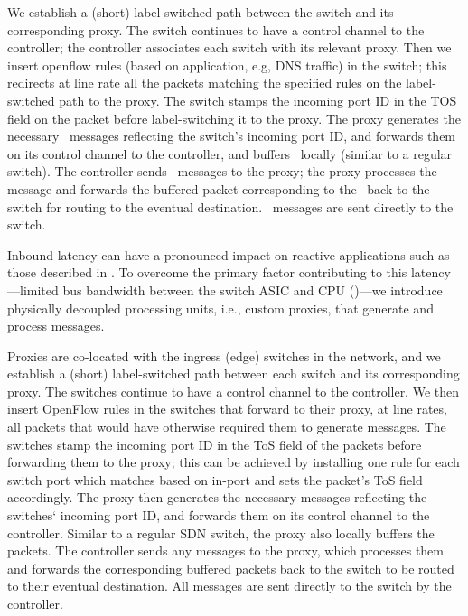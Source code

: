 We establish a (short) label-switched path between the switch and its
corresponding proxy. The switch continues to have a control
channel to the controller; the controller associates each switch with its
relevant proxy. Then we insert openflow rules (based on application, e.g, DNS traffic) in the switch; this
redirects at line rate all the packets matching the specified rules 
on the label-switched path to the
proxy. The switch stamps the incoming port ID in the TOS field on the 
packet before label-switching it to the proxy.  The proxy 
generates the necessary \packetin\ messages reflecting the
switch's incoming port ID, and forwards them on its control channel to the
controller, and buffers \packetin\ locally (similar to a regular switch).
The controller sends \packetout\ messages to the proxy; the proxy processes the message and forwards the buffered packet corresponding to the \packetin\ back to 
the switch for routing to the eventual destination.  \flowmod\ messages are sent directly to the switch.\fi



Inbound latency can have a pronounced impact on reactive applications such as
those described in . 
To overcome the primary factor contributing to this latency---limited bus
bandwidth between the switch ASIC and CPU ()---we
introduce physically decoupled processing units, i.e., custom proxies, that
generate \packetin and process \packetout messages.


Proxies are co-located with the ingress (edge) switches in the network, and
we establish a (short) label-switched path between each switch and its
corresponding proxy. The switches continue to have a control channel to the
controller. We then insert OpenFlow rules in the switches that forward to
their proxy, at line rates, all packets that would have otherwise required
them to generate \packetin messages. The switches stamp the incoming port ID
in the ToS field of the packets before forwarding them to the proxy; this can
be achieved by installing one rule for each switch port which matches
based on in-port and sets the packet's ToS
field accordingly. The
proxy then generates the necessary \packetin messages reflecting the
switches` incoming port ID, and forwards them on its control channel to the
controller. Similar to a regular SDN switch, the proxy also locally buffers
the packets. The controller sends any \packetout messages to the proxy, which
processes them and forwards the corresponding buffered packets back to the
switch to be routed to their eventual destination. All \flowmod messages are sent
directly to the switch by the controller. 

